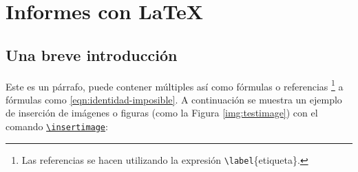 %
%

\section{Informes con \LaTeX}
	
	\subsection{Una breve introducción}
		
		Este es un párrafo, puede contener múltiples  así como fórmulas o referencias \footnote{Las referencias se hacen utilizando la expresión \texttt{\textbackslash label}\{etiqueta\}.} a fórmulas como \eqref{eqn:identidad-imposible}. A continuación se muestra un ejemplo de inserción de imágenes o figuras (como la Figura \ref{img:testimage}) con el comando \href{http://latex.ppizarror.com/informe.html#hlp-imagen}{\texttt{\textbackslash insertimage}}:
		
		
